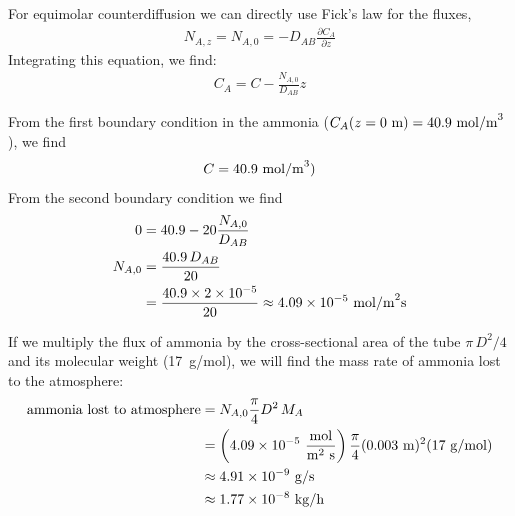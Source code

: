 \documentclass[calculator,datasheet,handbook,solutions]{exam}
\begin{document}
{\begin{question}
\begin{enumerate}[a)]
{        For equimolar counterdiffusion we can directly use Fick's law
        for the fluxes,
        \begin{align*}
          N_{A,z}=N_{A,0} = -D_{AB} \frac{\partial C_A}{\partial z}
        \end{align*}
        Integrating this equation, we find:
        \begin{align*}
          C_A = C - \frac{N_{A,0}}{D_{AB}} z
        \end{align*}
        
        From the first boundary condition in the ammonia
        ($C_A(z=0~\text{m})=40.9~{\rm mol/m}^3$), we find
        \begin{align*}
          C = 40.9~{\rm mol/m}^3)
        \end{align*}
        From the second boundary condition we find
        \begin{align*}
          0 &= 40.9 - 20 \frac{N_{A,0}}{D_{AB}} \\
          N_{A,0} &= \frac{40.9\,D_{AB}}{20} \\
            &= \frac{40.9\times 2\times10^{-5}}{20} \approx 4.09\times10^{-5}~{\rm mol/m}^2{\rm s}
        \end{align*}
        
        If we multiply the flux of ammonia by the cross-sectional area
        of the tube $\pi\,D^2/4$ and its molecular weight (17~g/mol), we
        will find the mass rate of ammonia lost to the atmosphere:
        \begin{align*}
          \mbox{ammonia lost to atmosphere} &= N_{A,0} \frac{\pi}{4}D^2\,M_{A} 
          \\
                                            &= \left(4.09\times10^{-5}~\frac{\rm mol}{{\rm m}^2~{\rm s}}\right)
                                              \frac{\pi}{4}(0.003~{\rm m})^2(17~{\rm g/mol})
          \\
                                            &\approx 4.91\times10^{-9}~{\rm g/s}
          \\
                                            &\approx 1.77\times10^{-8}~{\rm kg/h}
        \end{align*}
        
}
\end{enumerate}
\end{question}}
\end{document}
